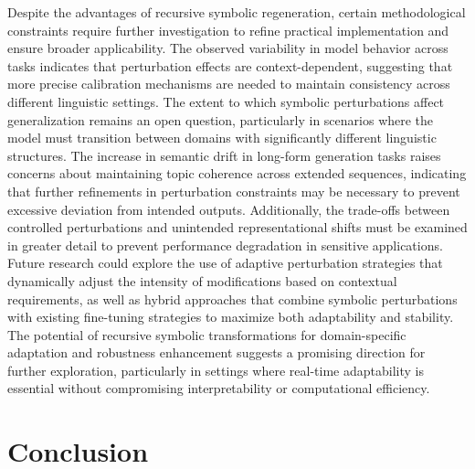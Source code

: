 \documentclass[5p,times]{elsarticle}
\begin{document}
Despite the advantages of recursive symbolic regeneration, certain methodological constraints require further investigation to refine practical implementation and ensure broader applicability. The observed variability in model behavior across tasks indicates that perturbation effects are context-dependent, suggesting that more precise calibration mechanisms are needed to maintain consistency across different linguistic settings. The extent to which symbolic perturbations affect generalization remains an open question, particularly in scenarios where the model must transition between domains with significantly different linguistic structures. The increase in semantic drift in long-form generation tasks raises concerns about maintaining topic coherence across extended sequences, indicating that further refinements in perturbation constraints may be necessary to prevent excessive deviation from intended outputs. Additionally, the trade-offs between controlled perturbations and unintended representational shifts must be examined in greater detail to prevent performance degradation in sensitive applications. Future research could explore the use of adaptive perturbation strategies that dynamically adjust the intensity of modifications based on contextual requirements, as well as hybrid approaches that combine symbolic perturbations with existing fine-tuning strategies to maximize both adaptability and stability. The potential of recursive symbolic transformations for domain-specific adaptation and robustness enhancement suggests a promising direction for further exploration, particularly in settings where real-time adaptability is essential without compromising interpretability or computational efficiency.


\section{Conclusion}
\end{document}
